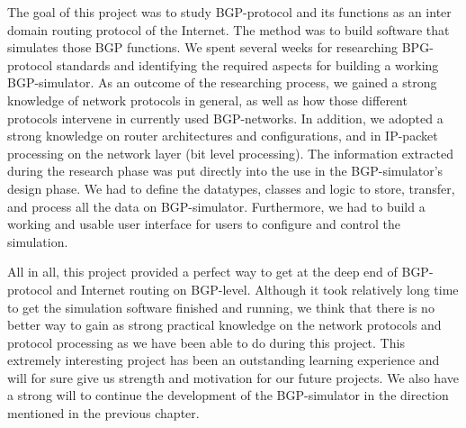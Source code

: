 The goal of this project was to study B\-G\-P-\/protocol and its functions as an inter domain routing protocol of the Internet. The method was to build software that simulates those B\-G\-P functions. We spent several weeks for researching B\-P\-G-\/protocol standards and identifying the required aspects for building a working B\-G\-P-\/simulator. As an outcome of the researching process, we gained a strong knowledge of network protocols in general, as well as how those different protocols intervene in currently used B\-G\-P-\/networks. In addition, we adopted a strong knowledge on router architectures and configurations, and in I\-P-\/packet processing on the network layer (bit level processing). The information extracted during the research phase was put directly into the use in the B\-G\-P-\/simulator's design phase. We had to define the datatypes, classes and logic to store, transfer, and process all the data on B\-G\-P-\/simulator. Furthermore, we had to build a working and usable user interface for users to configure and control the simulation.

All in all, this project provided a perfect way to get at the deep end of B\-G\-P-\/protocol and Internet routing on B\-G\-P-\/level. Although it took relatively long time to get the simulation software finished and running, we think that there is no better way to gain as strong practical knowledge on the network protocols and protocol processing as we have been able to do during this project. This extremely interesting project has been an outstanding learning experience and will for sure give us strength and motivation for our future projects. We also have a strong will to continue the development of the B\-G\-P-\/simulator in the direction mentioned in the previous chapter. 